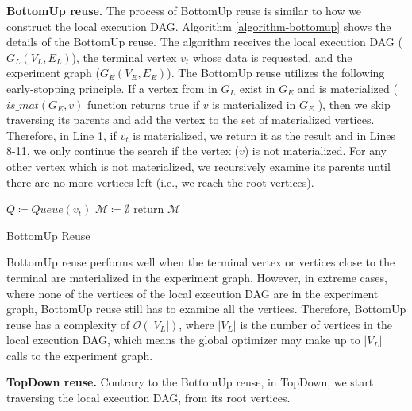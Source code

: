 \textbf{BottomUp reuse.}
The process of BottomUp reuse is similar to how we construct the local execution DAG.
Algorithm \ref{algorithm-bottomup} shows the details of the BottomUp reuse.
The algorithm receives the local execution DAG ($G_L(V_L, E_L)$), the terminal vertex $v_t$ whose data is requested, and the experiment graph ($G_E(V_E, E_E)$).
The BottomUp reuse utilizes the following early-stopping principle. 
If a vertex from in $G_L$ exist in $G_E$ and is materialized ($is\_mat(G_E, v)$ function returns true if $v$ is materialized in $G_E$ ), then we skip traversing its parents and add the vertex to the set of materialized vertices.
Therefore, in Line 1, if $v_t$ is materialized, we return it as the result and in Lines 8-11, we only continue the search if the vertex ($v$) is not materialized.
For any other vertex which is not materialized, we recursively examine its parents until there are no more vertices left (i.e., we reach the root vertices).

\begin{algorithm}[h]
$Q \coloneqq  Queue(v_t)$\;
$\mathcal{M} \coloneqq \emptyset$\;
return $\mathcal{M}$\;
\caption{BottomUp Reuse}\label{algorithm-bottomup}
\end{algorithm}
BottomUp reuse performs well when the terminal vertex or vertices close to the terminal are materialized in the experiment graph.
However, in extreme cases, where none of the vertices of the local execution DAG are in the experiment graph, BottomUp reuse still has to examine all the vertices.
Therefore, BottomUp reuse has a complexity of $\mathcal{O}(|V_L|)$, where $|V_L|$ is the number of vertices in the local execution DAG, which means the global optimizer may make up to $|V_L|$ calls to the experiment graph.

\textbf{TopDown reuse.}
Contrary to the BottomUp reuse, in TopDown, we start traversing the local execution DAG, from its root vertices.

